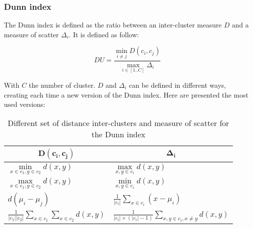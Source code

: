     \subsubsection{Dunn index}
    The Dunn index is defined as the ratio between an inter-cluster measure $D$ and a measure of scatter $\Delta_i$. It is defined as follow:

    \begin{equation}
        DU = \frac{\min\limits_{i \neq j}D(c_i, c_j)}{\max\limits_{i \in [1..C]} \Delta_i}
        \label{eq:du_index}
    \end{equation}

    With $C$ the number of cluster. $D$ and $\Delta_i$ can be defined in different ways, creating each time a new version of the Dunn index. Here are presented the most used versions:

    \vspace{0.8cm}

    {\setlength{\extrarowheight}{10pt}%
    \begin{table}[h]
    \centering
    \begin{tabular}{ll}
    \multicolumn{1}{c}{$\mathbf{D(c_i, c_j)}$}                   & \multicolumn{1}{c}{$\mathbf{\Delta_i}$}                                   \\ [10pt] \bottomrule
    $\min\limits_{x \in c_1, y \in c_2} d(x, y)$                           & $\max\limits_{x, y \in c_i} d(x,y)$                                                       \\ [10pt] \bottomrule
    $\max\limits_{x \in c_1, y \in c_2} d(x, y)$                           & $\min\limits_{x, y \in c_i} d(x,y)$                                                       \\ [10pt] \bottomrule
    $d(\mu_i - \mu_j)$                                             & $\frac{1}{|c_i|}\sum_{x \in c_i}(x - \mu_i)$                               \\ [10pt] \bottomrule
    $\frac{1}{|c_1||c_2|}\sum\limits_{x \in c_1}\sum\limits_{x \in c_2} d(x, y)$ & $\frac{1}{|c_i| \times (|c_i| - 1)} \sum\limits_{x, y \in c_i, x \neq y} d(x, y)$ \\ [10pt] \bottomrule
    \end{tabular}
    \caption{Different set of distance inter-clusters and measure of scatter for the Dunn index}
\label{tab:all_dunn_index}
    \end{table}}

    \vspace{0.8cm}

